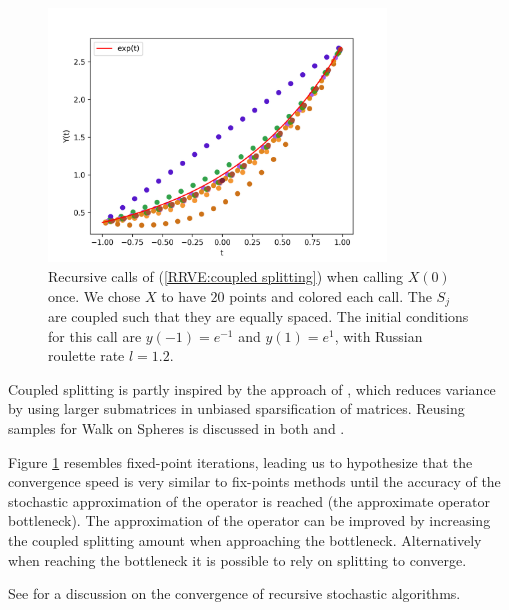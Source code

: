 \documentclass[a4paper,12pt]{article}
\begin{document}
\begin{figure}[h!]
  \centering
  \includegraphics[width=0.8\textwidth]{plots/coupled_split.png}
  \caption{Recursive calls of (\ref{RRVE:coupled splitting}) when
  calling $X(0)$ once. We chose $X$ to have $20$ points and
  colored each call. The $S_{j}$ are coupled such that
  they are equally spaced.
  The initial conditions for this call are $y(-1)=e^{-1}$ and $y(1)=e^{1}$,
  with Russian roulette rate $l=1.2$. }
  \label{fig:coupled splitting}
\end{figure}

\begin{related}
  Coupled splitting is partly inspired by the approach
  of \cite{sabelfeld_sparsified_2009}, which reduces
  variance by using larger submatrices in unbiased sparsification
  of matrices.
  Reusing samples for Walk on Spheres is discussed in both
  \cite{miller_boundary_2023} and \cite{bakbouk_mean_2023}.
\end{related}

Figure \ref{fig:coupled splitting}
resembles fixed-point iterations, leading us to hypothesize
that the convergence
speed is very similar to fix-points methods until the accuracy
of the stochastic approximation of the operator is reached
(the approximate operator bottleneck). The approximation of the operator
can be improved by increasing the coupled splitting amount when
approaching the bottleneck. Alternatively when reaching
the bottleneck it is possible to rely on splitting to converge.

\begin{related}
  See \cite{gupta_convergence_2021} for a discussion on the convergence
  of recursive stochastic algorithms.
\end{related}
\end{document}
